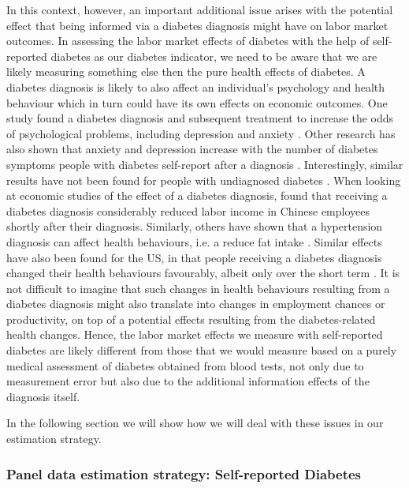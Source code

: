 \documentclass[12pt,english,british]{article}
\begin{document}
In this context, however, an important additional issue arises with the potential effect that being informed via a diabetes diagnosis
might have on labor market outcomes. In assessing the labor market
effects of diabetes with the help of self-reported diabetes as our
diabetes indicator, we need to be aware that we are likely measuring
something else then the pure health effects of diabetes. A diabetes
diagnosis is likely to also affect an individual's psychology and
health behaviour which in turn could have its own effects on economic
outcomes. One study found a diabetes diagnosis and subsequent treatment
to increase the odds of psychological problems, including depression
and anxiety \citep{17003303}. Other research has also shown that
anxiety and depression increase with the number of diabetes symptoms
people with diabetes self-report after a diagnosis \cite{Paddison_2011}.
Interestingly, similar results have not been found for people with
undiagnosed diabetes \citep{Nouwen2011}. When looking at economic
studies of the effect of a diabetes diagnosis, \citet{Liu2014} found
that receiving a diabetes diagnosis considerably reduced labor income
in Chinese employees shortly after their diagnosis. Similarly, others
have shown that a hypertension diagnosis can affect health
behaviours, i.e. a reduce fat intake \citep{Zhao2013a}. Similar effects have also been found
for the US, in that people receiving a diabetes diagnosis changed
their health behaviours favourably, albeit only over the short term
\citep{Slade2012}. It is not difficult to imagine that such changes in
health behaviours resulting from a diabetes diagnosis might also translate
into changes in employment chances or productivity, on top of a potential
effects resulting from the diabetes-related health changes. Hence, the labor market effects we measure with self-reported diabetes are likely different from those
that we would measure based on a purely medical assessment of diabetes
obtained from blood tests, not only due to measurement error but also
due to the additional information effects of the diagnosis itself.


 In the following section we will show how we will deal with these issues in our estimation strategy.


\subsubsection{Panel data estimation strategy: Self-reported Diabetes}
\end{document}
